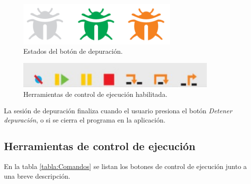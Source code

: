 \begin{figure}[h]
	\centering
	\includegraphics[width=8cm]{./Figures/estadosBotonDebug.PNG}
	\caption{Estados del botón de depuración.}
	\label{fig:debug_view_habilitada}
\end{figure}


\begin{figure}[h]
	\centering
	\includegraphics[width=10cm]{./Figures/herramientas-control-ejecucion.PNG}
	\caption{Herramientas de control de ejecución habilitada.}
	\label{fig:herramientas-control-ejecucion}
\end{figure}

La sesión de depuración finaliza cuando el usuario presiona el botón \emph{Detener depuración}, o si se cierra el programa en la aplicación.

\subsection{Herramientas de control de ejecución}
\label{subsubsec:Iniciar/Herramientas de control de ejecución}

En la tabla \ref{tabla:Comandos} se listan los botones de control de ejecución junto a una breve descripción.


